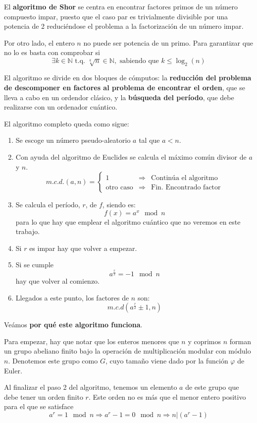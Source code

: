 \documentclass[nochap]{apuntesURJC}
\begin{document}
El \textbf{algoritmo de Shor} se centra en encontrar factores primos de un número compuesto impar, puesto que el caso par es trivialmente divisible por una potencia de 2 reduciéndose el problema a la factorización de un número impar.

Por otro lado, el entero $n$ no puede ser potencia de un primo. Para garantizar que no lo es basta con comprobar si
\[\exists k \in \mathbb{N} \text{ t.q. } \sqrt[k]{n} \in \mathbb{N}, \text{ sabiendo que } k\leq \log_2(n)\]

El algoritmo se divide en dos bloques de cómputos: la \textbf{reducción del problema de descomponer en factores al problema de encontrar el orden}, que se lleva a cabo en un ordendor clásico, y la \textbf{búsqueda del período}, que debe realizarse con un ordenador cuántico.

El algoritmo completo queda como sigue:
\begin{enumerate}
\item Se escoge un número pseudo-aleatorio $a$ tal que $a<n$.
\item Con ayuda del algoritmo de Euclides se calcula el máximo común divisor de $a$ y $n$.
\[m.c.d.(a,n) = \left\{ \begin{array}{lcl}
1 & \Rightarrow & \text{Continúa el algoritmo}\\
\text{otro caso} & \Rightarrow & \text{Fin. Encontrado factor}
\end{array}\right.\]
\item Se calcula el período, $r$, de $f$, siendo es:
\[f(x)=a^x \mod n\]
para lo que hay que emplear el algoritmo cuántico que no veremos en este trabajo.
\item Si $r$ es impar hay que volver a empezar.
\item Si se cumple
\[a^{\frac{r}{2}}=-1 \mod n\]
hay que volver al comienzo.
\item Llegados a este punto, los factores de $n$ son:
\[m.c.d\left(a^{\frac{r}{2}}\pm 1, n\right)\]
\end{enumerate}

Veámos \textbf{por qué este algoritmo funciona}.

Para empezar, hay que notar que los enteros menores que $n$ y coprimos $n$ forman un grupo abeliano finito bajo la operación de multiplicación modular con módulo $n$. Denotemos este grupo como $G$, cuyo tamaño viene dado por la función $\varphi$ de Euler.

Al finalizar el paso 2 del algoritmo, tenemos un elemento $a$ de este grupo que debe tener un orden finito $r$. Este orden no es más que el menor entero positivo para el que se satisface
\[a^r = 1 \mod n \Rightarrow a^r-1 = 0 \mod n \Rightarrow n|(a^r-1)\]
\end{document}

